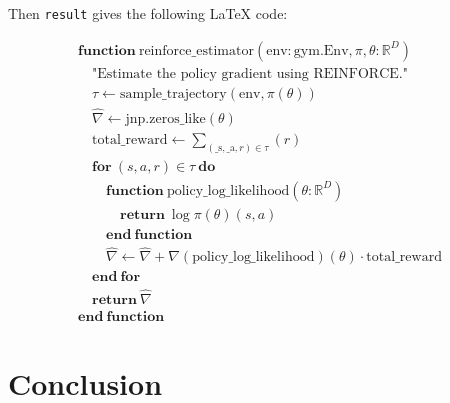 \documentclass{article}
\begin{document}
Then \verb|result| gives the following \LaTeX{} code:

\[ \begin{array}{l} \mathbf{function} \ \mathrm{reinforce\_estimator}(\mathrm{env}: \mathrm{gym}.\mathrm{Env}, \pi, \theta: \mathbb{R}^{D}) \\ \hspace{1em} \textrm{"Estimate the policy gradient using REINFORCE."} \\ \hspace{1em} \tau \gets \mathrm{sample\_trajectory} \mathopen{}\left( \mathrm{env}, \pi \mathopen{}\left( \theta \mathclose{}\right) \mathclose{}\right) \\ \hspace{1em} \widehat{\nabla} \gets \mathrm{jnp}.\mathrm{zeros\_like} \mathopen{}\left( \theta \mathclose{}\right) \\ \hspace{1em} \mathrm{total\_reward} \gets \sum_{\mathopen{}\left( \mathrm{\_s}, \mathrm{\_a}, r \mathclose{}\right) \in \tau}^{} \mathopen{}\left({r}\mathclose{}\right) \\ \hspace{1em} \mathbf{for} \ \mathopen{}\left( s, a, r \mathclose{}\right) \in \tau \ \mathbf{do} \\ \hspace{2em} \mathbf{function} \ \mathrm{policy\_log\_likelihood}(\theta: \mathbb{R}^{D}) \\ \hspace{3em} \mathbf{return} \ \log \pi \mathopen{}\left( \theta \mathclose{}\right) \mathopen{}\left( s, a \mathclose{}\right) \\ \hspace{2em} \mathbf{end \ function} \\ \hspace{2em} \widehat{\nabla} \gets \widehat{\nabla} + \nabla \mathopen{}\left( \mathrm{policy\_log\_likelihood} \mathclose{}\right) \mathopen{}\left( \theta \mathclose{}\right) \cdot \mathrm{total\_reward} \\ \hspace{1em} \mathbf{end \ for} \\ \hspace{1em} \mathbf{return} \ \widehat{\nabla} \\ \mathbf{end \ function} \end{array} \]

\section{Conclusion}
\end{document}
